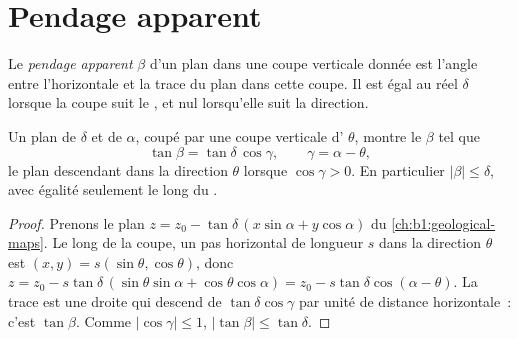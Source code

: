 \section{Pendage apparent}\label{sec:b1:cross-sections:apparent}

\begin{definition}\label{def:b1:cross-sections:apparent-dip}
Le \emph{pendage apparent} $\beta$ d'un plan dans une
coupe verticale donnée est l'angle entre l'horizontale et la trace du plan dans
cette coupe. Il est égal au  réel $\delta$ lorsque la coupe suit le , et nul lorsqu'elle suit la direction.
\end{definition}

\begin{theorem}\label{thm:b1:cross-sections:apparent-dip}
Un plan de  $\delta$ et de  $\alpha$, coupé par une coupe
verticale d' $\theta$, montre le  $\beta$ tel que
\[
  \tan\beta = \tan\delta\,\cos\gamma, \qquad \gamma = \alpha - \theta ,
\]
le plan descendant dans la direction $\theta$ lorsque $\cos\gamma > 0$.
En particulier $|\beta| \le \delta$, avec égalité seulement le long du .
\end{theorem}

\begin{proof}
Prenons le plan $z = z_0 - \tan\delta\,(x\sin\alpha + y\cos\alpha)$ du
\cref{ch:b1:geological-maps}. Le long de la coupe, un pas horizontal de longueur
$s$ dans la direction $\theta$ est $(x, y) = s(\sin\theta, \cos\theta)$, donc
$z = z_0 - s\tan\delta\,(\sin\theta\sin\alpha + \cos\theta\cos\alpha) =
z_0 - s\tan\delta\cos(\alpha - \theta)$. La trace est une droite qui descend de
$\tan\delta\cos\gamma$ par unité de distance horizontale~: c'est
$\tan\beta$. Comme $|\cos\gamma| \le 1$, $|\tan\beta| \le \tan\delta$.
\end{proof}

